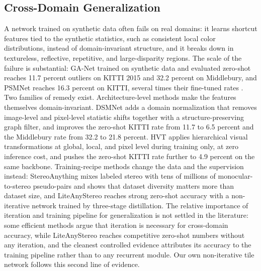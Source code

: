 \subsection{Cross-Domain Generalization}
A network trained on synthetic data often fails on real domains: it
learns shortcut features tied to the synthetic statistics, such as
consistent local color distributions, instead of domain-invariant
structure, and it breaks down in textureless, reflective, repetitive, and
large-disparity regions. The scale of the failure is substantial: GA-Net
trained on synthetic data and evaluated zero-shot reaches 11.7 percent
outliers on KITTI 2015 and 32.2 percent on Middlebury, and PSMNet reaches
16.3 percent on KITTI, several times their fine-tuned rates
\cite{zhang2020dsmnet}. Two families
of remedy exist. Architecture-level methods make the features themselves
domain-invariant. DSMNet \cite{zhang2020dsmnet} adds a domain
normalization that removes image-level and pixel-level statistic shifts
together with a structure-preserving graph filter, and improves the
zero-shot KITTI rate from 11.7 to 6.5 percent and the Middlebury rate
from 32.2 to 21.8 percent. HVT \cite{chang2023hvt} applies hierarchical
visual transformations at global, local, and pixel level during training
only, at zero inference cost, and pushes the zero-shot KITTI rate further
to 4.9 percent on the same backbone. Training-recipe methods change the
data and the supervision instead: StereoAnything
\cite{guo2024stereoanything} mixes labeled stereo with tens of millions
of monocular-to-stereo pseudo-pairs and shows that dataset diversity
matters more than dataset size, and LiteAnyStereo
\cite{jing2025liteanystereo} reaches strong zero-shot accuracy with a
non-iterative network trained by three-stage distillation. The relative
importance of iteration and training pipeline for generalization is not
settled in the literature: some efficient methods argue that iteration is
necessary for cross-domain accuracy, while LiteAnyStereo reaches
competitive zero-shot numbers without any iteration, and the cleanest
controlled evidence attributes its accuracy to the training pipeline
rather than to any recurrent module. Our own non-iterative tile network
follows this second line of evidence.

\FloatBarrier
